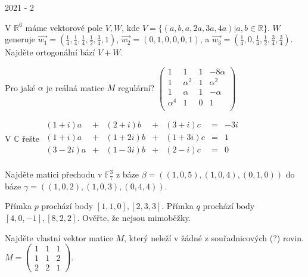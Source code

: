 
\newpage
{\large 2021 - 2}

\begin{questions}

\question V \(\mathbb{R}^6\) máme vektorové pole \(V, W\), kde \(V = \{ (a, b, a, 2a, 3a, 4a) | a, b \in \mathbb{R} \}\). \(W\) generuje \(\overrightarrow{w_1} = (\frac{1}{4}, \frac{1}{4}, \frac{1}{4}, \frac{1}{2}, \frac{3}{4}, 1)\), \(\overrightarrow{w_2} = (0, 1, 0, 0, 0, 1)\), a \(\overrightarrow{w_3} = (\frac{1}{4}, 0, \frac{1}{4}, \frac{1}{2}, \frac{3}{4}, \frac{3}{4})\). Najděte ortogonální bází \(V + W\).

\question Pro jaké \(\alpha\) je reálná matice \(M\) regulární? \(\begin{pmatrix}
    1        &        1 & 1 & -8\alpha\\
    1        & \alpha^2 & 1 & \alpha^2\\
    1        &   \alpha & 1 &  -\alpha\\
    \alpha^4 &        1 & 0 &        1\\
\end{pmatrix}\)

\newpage
\question V \(\mathbb{C}\) řešte \(\begin{matrix}
     (1+i)a & + &  (2+i)b & + &  (3+i)c & = & -3i\\
     (1+i)a & + & (1+2i)b & + & (1+3i)c & = & 1\\
    (3-2i)a & + & (1-3i)b & + &  (2-i)c & = & 0\\
\end{matrix}\)

\question Najděte matici přechodu v \(\mathbb{F}_7^3\) z báze \(\beta = ((1,0,5),(1,0,4),(0,1,0))\) do báze \(\gamma = ((1,0,2),(1,0,3),(0,4,4))\).

\newpage
\question Přímka \(p\) prochází body \([1,1,0], [2,3,3]\). Přímka \(q\) prochází body \([4,0,-1], [8,2,2]\). Ověřte, že nejsou mimoběžky.

\question Najděte vlastní vektor matice \(M\), který neleží v žádné z souřadnicových (?) rovin. \(M = \begin{pmatrix}
    1 & 1 & 1\\
    1 & 1 & 2\\
    2 & 2 & 1
\end{pmatrix}\).

\end{questions}

